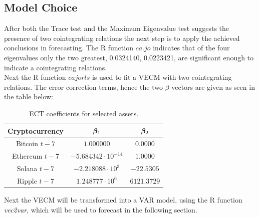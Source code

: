 \subsection{Model Choice}
After both the Trace test and the Maximum Eigenvalue test suggests the presence of two cointegrating relations the next step is to apply the achieved conclusions in forecasting. The R function $ca.jo$ indicates that of the four eigenvalues only the two greatest, 0.0324140, 0.0223421, are significant enough to indicate a cointegrating relations.\\
Next the R function $cajorls$ is used to fit a VECM with two cointegrating relations. The error correction terms, hence the two $\beta$ vectors are given as seen in the table below:\\
\begin{table}[h!]
\centering
\begin{tabular}{|c|c|c|}
\hline
\textbf{Cryptocurrency} & $\boldsymbol{\beta}_1$ & $\boldsymbol{\beta}_2$ \\ \hline
Bitcoin $t-7$  & $1.000000$  & $0.0000$      \\ \hline
Ethereum $t-7$  & $-5.684342 \cdot 10^{-14}$ & $1.0000$    \\\hline
Solana $t-7$  & $-2.218088 \cdot 10^3$ & $-22.5305$    \\ \hline
Ripple $t-7$  & $1.248777 \cdot 10^6$  & $6121.3729$   \\ \hline
\end{tabular}
\caption{ECT coefficients for selected assets.}
\label{tab:ect_coefficients}
\end{table}

\noindent Next the VECM will be transformed into a VAR model, using the R function \textit{vec2var}, which will be used to forecast in the following section.



